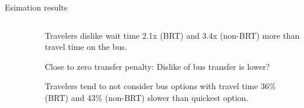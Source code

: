 \documentclass[notes,11pt, aspectratio=169]{beamer}
\newenvironment{wideitemize}{\itemize\addtolength{\itemsep}{0.4em}}{\enditemize}
\begin{document}
\begin{frame}{Esimation results}
	\begin{columns}
		\begin{column}{0.5\textwidth}
	\begin{figure}
	\end{figure}
\end{column}
\begin{column}{0.5\textwidth}
\begin{wideitemize}
\item Travelers dislike wait time 2.1x (BRT) and 3.4x (non-BRT) more than travel time on the bus.
\item Close to zero transfer penalty: Dislike of bus transfer is lower?
\item Travelers tend to not consider bus options with travel time 36\% (BRT) and 43\% (non-BRT) slower than quickest option.
\end{wideitemize}	
\end{column}
\end{columns}
\end{frame}
\end{document}
